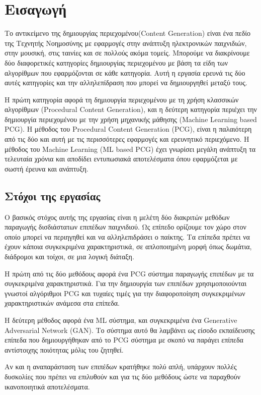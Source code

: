 \chapter{Εισαγωγή}

\par
Το αντικείμενο της δημιουργίας περιεχομένου(Content Generation) είναι ένα πεδίο της Τεχνητής Νοημοσύνης με εφαρμογές στην ανάπτυξη ηλεκτρονικών παιχνιδιών, στην μουσική, στις ταινίες και σε πολλούς ακόμα τομείς. Μπορούμε να διακρίνουμε δύο διαφορετικές κατηγορίες δημιουργίας περιεχομένου με βάση τα είδη των αλγορίθμων που εφαρμόζονται σε κάθε κατηγορία. Αυτή η εργασία ερευνά τις δύο αυτές κατηγορίες και την αλληλεπίδραση που μπορεί να δημιουργηθεί μεταξύ τους.
\par
Η πρώτη κατηγορία αφορά τη δημιουργία περιεχομένου με τη χρήση κλασσικών αλγορίθμων (Procedural Content Generation), και η δεύτερη κατηγορία περιέχει την δημιουργία περιεχομένου με την χρήση μηχανικής μάθησης (Machine Learning based PCG). Η μέθοδος του Procedural Content Generation (PCG), είναι η παλαιότερη από τις δύο και αυτή με τις περισσότερες εφαρμογές και ερευνητικό περιεχόμενο. Η μέθοδος του Machine Learning (ML based PCG) έχει γνωρίσει μεγάλη ανάπτυξη τα τελευταία χρόνια και αποδίδει εντυπωσιακά αποτελέσματα όπου εφαρμόζεται με σωστή έρευνα και ανάπτυξη.

\section{Στόχοι της εργασίας}
\par
Ο βασικός στόχος αυτής της εργασίας είναι η μελέτη δύο διακριτών μεθόδων παραγωγής δισδιάστατων επιπέδων παιχνιδιού. Ως επίπεδο ορίζουμε τον χώρο  στον οποίο μπορεί να περιηγηθεί και να αλληλεπιδράσει ο παίκτης. Τα επίπεδα πρέπει να έχουν κάποια συγκεκριμένα χαρακτηριστικά, σε απλοποιημένη μορφή όπως δωμάτια, διάδρομοι και τοίχοι, σε μια λογική διάταξη.
\par
Η πρώτη από τις δύο μεθόδους αφορά ένα PCG σύστημα παραγωγής επιπέδων με τα συγκεκριμένα χαρακτηριστικά. Για την δημιουργία των επιπέδων χρησιμοποιούνται γνωστοί αλγόριθμοι PCG και τυχαίες τιμές για την διαφοροποίηση συγκεκριμένων χαρακτηριστικών ανάμεσα στα επίπεδα.
\par
Η δεύτερη μέθοδος αφορά ένα ML σύστημα, και συγκεκριμένα ένα Generative Adversarial Network (GAN). Το σύστημα αυτό θα λαμβάνει ως είσοδο εκπαίδευσης επίπεδα που δημιουργήθηκαν από το PCG σύστημα με σκοπό να παράγει επίπεδα αντίστοιχης ποιότητας μόλις του ζητηθεί.
\par
Αν και η αναπαράσταση των επιπέδων κρατήθηκε πολύ απλή, υπάρχουν πολλές δυσκολίες που πρέπει να επιλυθούν και για τις δύο μεθόδους ώστε να παραχθούν ικανοποιητικά αποτελέσματα.

